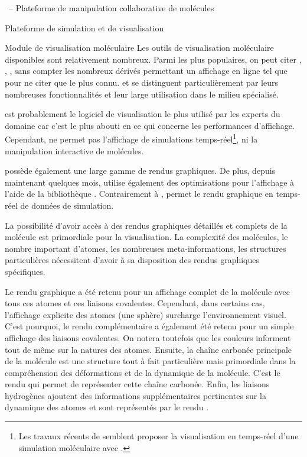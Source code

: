 \documentclass[myfrancais,ngerman,english,frenchb]{mythesis}
\begin{document}
\begin{mychapter}{\myShaddock\ -- Plateforme de manipulation collaborative de molécules}
\begin{mysection}{Plateforme de simulation et de visualisation}
			\begin{mysubsection}{Module de visualisation moléculaire}
				Les outils de visualisation moléculaire disponibles sont relativement nombreux.
				Parmi les plus populaires, on peut citer \myPyMOL {},  , \myChimera {}, \myRasmol {} sans compter les nombreux dérivés permettant un affichage en ligne tel que \myJmol {} pour ne citer que le plus connu.
				\myPyMOL et  se distinguent particulièrement par leurs nombreuses fonctionnalités et leur large utilisation dans le milieu spécialisé.

				\myPyMOL est probablement le logiciel de visualisation le plus utilisé par les experts du domaine car c'est le plus abouti en ce qui concerne les performances d'affichage.
				Cependant, \myPyMOL ne permet pas l'affichage de simulations temps-réel\footnote{Les travaux récents de  semblent proposer la visualisation en temps-réel d'une simulation moléculaire avec \myPyMOL.}, ni la manipulation interactive de molécules.

				 possède également une large gamme de rendus graphiques.
				De plus, depuis maintenant quelques mois,  utilise également des optimisations \myGPU pour l'affichage à l'aide de la bibliothèque \myCUDA.
				Contrairement à \myPyMOL,  permet le rendu graphique en temps-réel de données de simulation.

				La possibilité d'avoir accès à des rendus graphiques détaillés et complets de la molécule est primordiale pour la visualisation.
				La complexité des molécules, le nombre important d'atomes, les nombreuses meta-informations, les structures particulières nécessitent d'avoir à sa disposition des rendus graphiques spécifiques.

				Le rendu graphique \myCPK a été retenu pour un affichage complet de la molécule avec tous ces atomes et ces liaisons covalentes.
				Cependant, dans certains cas, l'affichage explicite des atomes (une sphère) surcharge l'environnement visuel.
				C'est pourquoi, le rendu complémentaire \myLicorice a également été retenu pour un simple affichage des liaisons covalentes.
				On notera toutefois que les couleurs informent tout de même sur la natures des atomes.
				Ensuite, la chaîne carbonée principale de la molécule est une structure tout à fait particulière mais primordiale dans la compréhension des déformations et de la dynamique de la molécule.
				C'est le rendu \myNewRibbon qui permet de représenter cette chaîne carbonée.
				Enfin, les liaisons hydrogènes ajoutent des informations supplémentaires pertinentes sur la dynamique des atomes et sont représentés par le rendu \myHBonds.


\end{mysubsection}
\end{mysection}
\end{mychapter}
\end{document}

